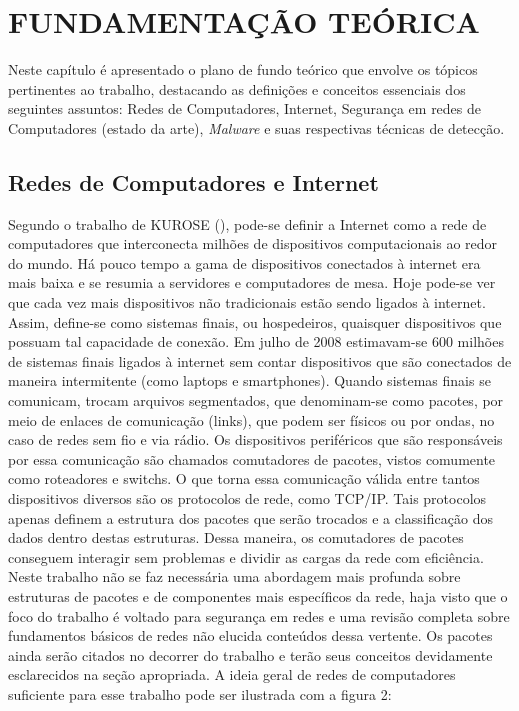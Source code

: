 
\chapter{FUNDAMENTAÇÃO TEÓRICA}
\label{c.fundamentacao}

Neste capítulo é apresentado o plano de fundo teórico que envolve os tópicos
pertinentes ao trabalho, destacando as definições e conceitos essenciais dos
seguintes assuntos: Redes de Computadores, Internet, Segurança em redes de
Computadores (estado da arte), \textit{Malware} e suas respectivas técnicas de
detecção.
\section{Redes de Computadores e Internet}
\label{s.teoria_redes_internet}

Segundo o trabalho de KUROSE (\citeyear{kurose09}), pode-se definir a Internet
como a rede de computadores que interconecta milhões de dispositivos
computacionais ao redor do mundo. Há pouco tempo a gama de dispositivos
conectados à internet era mais baixa e se resumia a servidores e computadores
de mesa. Hoje pode-se ver que cada vez mais dispositivos não tradicionais
estão sendo ligados à internet. Assim, define-se como sistemas finais, ou
hospedeiros, quaisquer dispositivos que possuam tal capacidade de conexão. Em
julho de 2008 estimavam-se 600 milhões de sistemas finais ligados à internet
sem contar dispositivos que são conectados de maneira intermitente (como
laptops e smartphones). Quando sistemas finais se comunicam, trocam arquivos
segmentados, que denominam-se como pacotes, por meio de enlaces de comunicação
(links), que podem ser físicos ou por ondas, no caso de redes sem fio e via
rádio. Os dispositivos periféricos que são responsáveis por essa comunicação
são chamados comutadores de pacotes, vistos comumente como roteadores e
switchs. O que torna essa comunicação válida entre tantos dispositivos
diversos são os protocolos de rede, como TCP/IP. Tais protocolos apenas
definem a estrutura dos pacotes que serão trocados e a classificação dos dados
dentro destas estruturas. Dessa maneira, os comutadores de pacotes conseguem
interagir sem problemas e dividir as cargas da rede com eficiência. Neste
trabalho não se faz necessária uma abordagem mais profunda sobre estruturas de
pacotes e de componentes mais específicos da rede, haja visto que o foco do
trabalho é voltado para segurança em redes e uma revisão completa sobre
fundamentos básicos de redes não elucida conteúdos dessa vertente. Os pacotes
ainda serão citados no decorrer do trabalho e terão seus conceitos devidamente
esclarecidos na seção apropriada. A ideia geral de redes de computadores
suficiente para esse trabalho pode ser ilustrada com a figura 2:

